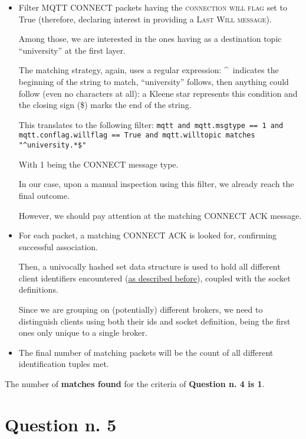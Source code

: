 \documentclass[a4paper,11pt]{article} %
\begin{document}
    \begin{itemize}
        \item Filter \textsc{MQTT CONNECT} packets having the \textsc{connection will flag} set to True (therefore, declaring interest in providing a \textsc{Last Will message}).

        Among those, we are interested in the ones having as a destination topic “university” at the first layer.

        The matching strategy, again, uses a regular expression: \textasciicircum \ indicates the beginning of the string to match, “university” follows, then anything could follow (even no characters at all): a Kleene star represents this condition and the closing sign (\$) marks the end of the string.

        This translates to the following filter:
        \texttt{mqtt and mqtt.msgtype == 1 and mqtt.conflag.willflag == True and mqtt.willtopic matches "\textasciicircum{}university.*\$"}

        With 1 being the \textsc{CONNECT} message type.

        In our case, upon a manual inspection using this filter, we already reach the final outcome.

        However, we should pay attention at the matching \textsc{CONNECT ACK} message.
        \item For each packet, a matching \textsc{CONNECT ACK} is looked for, confirming successful association.

        Then, a univocally hashed set data structure is used to hold all different client identifiers encountered (\hyperref[description-clientids]{as described before}), coupled with the socket definitions.

        Since we are grouping on (potentially) different brokers, we need to distinguish clients using both their ids and socket definition, being the first ones only unique to a single broker.

        \item The final number of matching packets will be the count of all different identification tuples met.
    \end{itemize}

    The number of \textbf{matches found} for the criteria of \textbf{Question n. 4 is 1}.


    \section{Question n. 5}\label{sec:question-n.-5}
\end{document}
